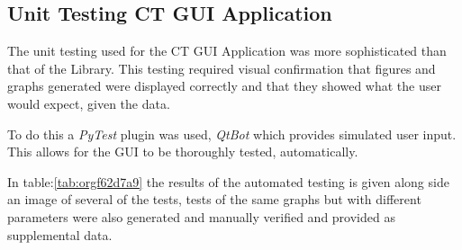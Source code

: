 \documentclass[11pt]{report}
\begin{document}
\clearpage

\subsection{Unit Testing CT GUI Application}
\label{sec:org6e5a40f}

The unit testing used for the CT GUI Application was more sophisticated than that of the Library. This testing required visual confirmation that figures and graphs generated were displayed correctly and that they showed what the user would expect, given the data.

To do this a \emph{PyTest} plugin was used, \emph{QtBot} which provides simulated user input. This allows for the GUI to be thoroughly tested, automatically.

In table:\ref{tab:orgf62d7a9} the results of the automated testing is given along side an image of several of the tests, tests of the same graphs but with different parameters were also generated and manually verified and provided as supplemental data.
\end{document}
